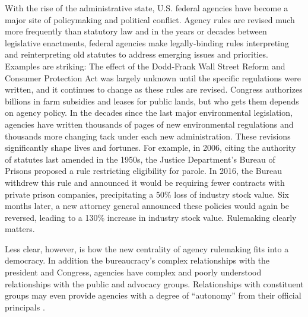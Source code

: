 With the rise of the administrative state, U.S. federal agencies have become a major site of policymaking and political conflict. Agency rules are revised much more frequently than statutory law \citep{Wagner2017} and in the years or decades between legislative enactments, federal agencies make legally-binding rules interpreting and reinterpreting old statutes to address emerging issues and priorities. %
Examples are striking: The effect of the Dodd-Frank Wall Street Reform and Consumer Protection Act was largely unknown until the specific regulations were written, and it continues to change as these rules are revised. 
Congress authorizes billions in farm subsidies and leases for public lands, but who gets them depends on agency policy. In the decades since the last major environmental legislation, agencies have written thousands of pages of new environmental regulations and thousands more changing tack under each new administration. These revisions significantly shape lives and fortunes. For example, in 2006, citing the authority of statutes last amended in the 1950s, the Justice Department's Bureau of Prisons proposed a rule restricting eligibility for parole. In 2016, the Bureau withdrew this rule and announced it would be requiring fewer contracts with private prison companies, precipitating a 50\% loss of industry stock value. Six months later, a new attorney general announced these policies would again be reversed, leading to a 130\% increase in industry stock value. %
Rulemaking clearly matters.

Less clear, however, is how the new centrality of agency rulemaking fits into a democracy. In addition the bureaucracy's complex relationships with the president and Congress, agencies have complex and poorly understood relationships with the public and advocacy groups. Relationships with constituent groups may even provide agencies with a degree of ``autonomy'' from their official principals \citep{Carpenter2001}. %

